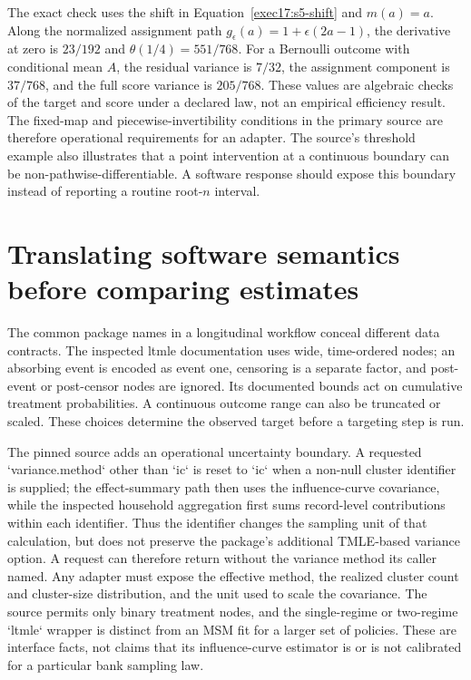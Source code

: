 The exact check uses the shift in Equation~\eqref{exec17:s5-shift} and
$m(a)=a$. Along the normalized assignment path
$g_\epsilon(a)=1+\epsilon(2a-1)$, the derivative at zero is $23/192$ and
$\theta(1/4)=551/768$. For a Bernoulli outcome with conditional mean $A$, the
residual variance is $7/32$, the assignment component is $37/768$, and the
full score variance is $205/768$. These values are algebraic checks of the
target and score under a declared law, not an empirical efficiency result.
The fixed-map and piecewise-invertibility conditions in the primary source are
therefore operational requirements for an adapter. The source's threshold
example also illustrates that a point intervention at a continuous boundary
can be non-pathwise-differentiable. A software response should expose this
boundary instead of reporting a routine root-$n$ interval.\citep{lmtp2023,exec17_s5_math}

\section{Translating software semantics before comparing estimates}
\label{exec17:s5-software}

The common package names in a longitudinal workflow conceal different data
contracts. The inspected ltmle documentation uses wide, time-ordered nodes;
an absorbing event is encoded as event one, censoring is a separate factor,
and post-event or post-censor nodes are ignored. Its documented bounds act on
cumulative treatment probabilities. A continuous outcome range can also be
truncated or scaled. These choices determine the observed target before a
targeting step is run.\citep{sw_ltmle}

The pinned source adds an operational uncertainty boundary. A requested
`variance.method` other than `ic` is reset to `ic` when a non-null cluster
identifier is supplied; the effect-summary path then uses the influence-curve
covariance, while the inspected household aggregation first sums record-level
contributions within each identifier. Thus the identifier changes the sampling
unit of that calculation, but does not preserve the package's additional
TMLE-based variance option. A request can therefore return without the
variance method its caller named. Any adapter must expose the effective method,
the realized cluster count and cluster-size distribution, and the unit used to
scale the covariance. The source permits only binary treatment nodes, and the
single-regime or two-regime `ltmle` wrapper is distinct from an MSM fit for a
larger set of policies. These are interface facts, not claims that its
influence-curve estimator is or is not calibrated for a particular bank
sampling law.\citep{sw_ltmle}

